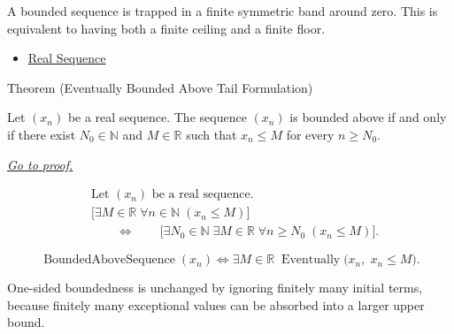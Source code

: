 \begin{remark*}[Interpretation]
A bounded sequence is trapped in a finite symmetric band around zero. This is
equivalent to having both a finite ceiling and a finite floor.
\end{remark*}

\begin{dependencies}
\begin{itemize}
  \item \hyperref[def:real-sequence]{Real Sequence}
\end{itemize}
\end{dependencies}


\begin{theorembox}{Theorem (Eventually Bounded Above Tail Formulation)}
\begin{theorem}
\label{thm:eventually-bounded-above-tail-formulation}
Let $(x_n)$ be a real sequence. The sequence $(x_n)$ is bounded above if and
only if there exist $N_0 \in \mathbb{N}$ and $M \in \mathbb{R}$ such that
$x_n \le M$ for every $n \ge N_0$.

\smallskip
\noindent
\hyperref[prf:eventually-bounded-above-tail-formulation]{\textit{Go to proof.}}
\end{theorem}
\end{theorembox}

\begin{remark*}
\[
\begin{aligned}
&\text{Let } (x_n) \text{ be a real sequence.}\\
&\bigl[
\exists M \in \mathbb{R}\;
\forall n \in \mathbb{N}\;(x_n \le M)
\bigr]\\
&\qquad\Longleftrightarrow\qquad
\bigl[
\exists N_0 \in \mathbb{N}\;
\exists M \in \mathbb{R}\;
\forall n \ge N_0\;(x_n \le M)
\bigr].
\end{aligned}
\]
\end{remark*}

\begin{remark*}
\[
\operatorname{BoundedAboveSequence}(x_n)
\Longleftrightarrow
\exists M \in \mathbb{R}\;
\operatorname{Eventually}\bigl(x_n,\; x_n \le M\bigr).
\]
\end{remark*}

\begin{remark*}[Interpretation]
One-sided boundedness is unchanged by ignoring finitely many initial terms,
because finitely many exceptional values can be absorbed into a larger upper
bound.
\end{remark*}

